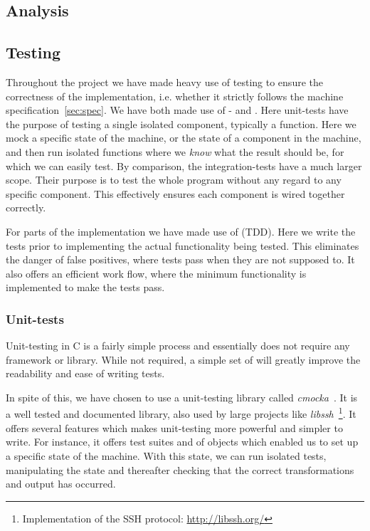 


\subsection{Analysis}

\subsection{Testing}


Throughout the project we have made heavy use of testing to ensure the
correctness of the implementation, i.e. whether it strictly follows the machine
specification~\ref{sec:spec}. We have both made use of - and
. Here unit-tests have the purpose of testing a single
isolated component, typically a function. Here we mock a specific state of the
machine, or the state of a component in the machine, and then run isolated
functions where we {\it know} what the result should be, for which we can easily
test. By comparison, the integration-tests have a much larger scope. Their
purpose is to test the whole program without any regard to any specific
component. This effectively ensures each component is wired together correctly.

For parts of the implementation we have made use of  (TDD). Here we write the tests prior to implementing the actual
functionality being tested. This eliminates the danger of false positives, where
tests pass when they are not supposed to. It also offers an efficient work flow,
where the minimum functionality is implemented to make the tests pass.

\subsubsection{Unit-tests}
Unit-testing in C is a fairly simple process and essentially does not require
any framework or library. While not required, a simple set of  will
greatly improve the readability and ease of writing tests.

In spite of this, we have chosen to use a unit-testing library called {\it
  cmocka}~\cite{cmocka}. It is a well tested and documented library, also used
by large projects like {\it libssh}~\footnote{Implementation of the SSH protocol:
  \url{http://libssh.org/}}. It offers several features which makes unit-testing
more powerful and simpler to write. For instance, it offers test suites and
 of objects which enabled us to set up a specific state of the
machine. With this state, we can run isolated tests, manipulating the state and
thereafter checking that the correct transformations and output has occurred.

